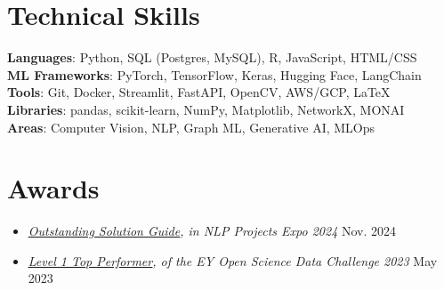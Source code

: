 \documentclass[letterpaper,10.9pt]{article}
\begin{document}
\section{Technical Skills}
 \begin{itemize}[leftmargin=0.15in, label={}]
    \small{\item{
     \textbf{Languages}{: Python, SQL (Postgres, MySQL), R, JavaScript, HTML/CSS} \\
     \textbf{ML Frameworks}{: PyTorch, TensorFlow, Keras, Hugging Face, LangChain} \\
     \textbf{Tools}{: Git, Docker, Streamlit, FastAPI, OpenCV, AWS/GCP, LaTeX} \\
     \textbf{Libraries}{: pandas, scikit-learn, NumPy, Matplotlib, NetworkX, MONAI} \\
     \textbf{Areas}{: Computer Vision, NLP, Graph ML, Generative AI, MLOps}
    }}
 \end{itemize}

\section{Awards}
  \begin{itemize}
    \item \textit{\href{https://drive.google.com/file/d/15Zye0DqQrMwGtM-SLBvWo5tUCdOG-SK7/view?usp=sharing}{\underline{Outstanding Solution Guide}}, in NLP Projects Expo 2024} \hfill {Nov. 2024}
    \item \textit{\href{https://drive.google.com/file/d/1PQot78NAxoTiHbD7beFBZICgjhwmDwTT/view?usp=sharing}{\underline{Level 1 Top Performer}}, of the EY Open Science Data Challenge 2023} \hfill {May 2023}
  \end{itemize}

\end{document}
